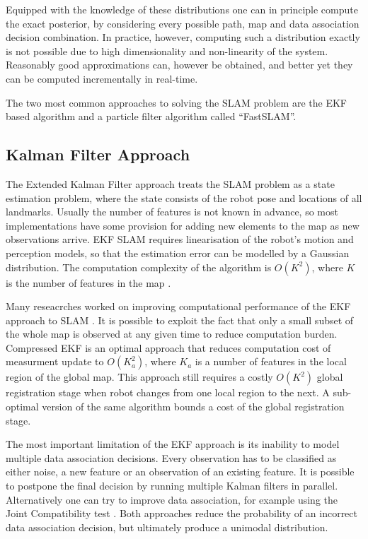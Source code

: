 Equipped with the knowledge of these distributions one can in
principle compute the exact posterior, by considering every possible
path, map and data association decision combination. In practice,
however, computing such a distribution exactly is not possible due to
high dimensionality and non-linearity of the system. Reasonably good
approximations can, however be obtained, and better yet they can be
computed incrementally in real-time.

The two most common approaches to solving the SLAM problem are the EKF
based algorithm and a particle filter algorithm called ``FastSLAM''.

\subsection{Kalman Filter Approach}
The Extended Kalman Filter approach treats the SLAM problem as a state
estimation problem, where the state consists of the robot pose and
locations of all landmarks. Usually the number of features is not
known in advance, so most implementations have some provision for
adding new elements to the map as new observations arrive. EKF SLAM
requires linearisation of the robot's motion and perception models, so
that the estimation error can be modelled by a Gaussian distribution.
The computation complexity of the algorithm is $O(K^2)$, where $K$ is
the number of features in the map \cite{ekf_slam}.

Many reseacrches worked on improving computational performance of the
EKF approach to SLAM
\cite{williams:acra2001,
williams2001esa,
knight2001tct,
guivant01,
tim_bailey,
uhlmann97nondivergent,
tardos02:_mappin_local_indoor_envir_using_sonar_data}.
It is possible to exploit the fact that only a small subset of the
whole map is observed at any given time to reduce computation burden.
Compressed EKF \cite{williams:acra2001} is an optimal approach that
reduces computation cost of measurment update to $O(K_a^2)$, where
$K_a$ is a number of features in the local region of the global map.
This approach still requires a costly $O(K^2)$ global registration
stage when robot changes from one local region to the next. A
sub-optimal version of the same algorithm bounds a cost of the global
registration stage.


The most important limitation of the EKF approach is its inability to
model multiple data association decisions. Every observation has to be
classified as either noise, a new feature or an observation of an
existing feature.  It is possible to postpone the final decision by
running multiple Kalman filters in parallel. Alternatively one can try
to improve data association, for example using the Joint Compatibility
test \cite{neira01:_data_assoc_stoch_mappin_using}.  Both approaches
reduce the probability of an incorrect data association decision, but
ultimately produce a unimodal distribution.

